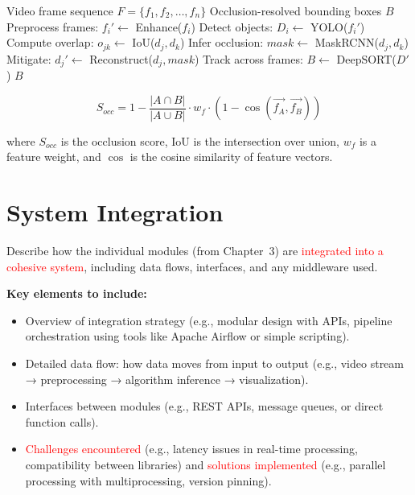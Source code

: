 \documentclass[12pt,a4paper]{report}
\theoremstyle{definition}
\theoremstyle{remark}
\begin{document}
\begin{algorithm}[htbp]
\caption{Occlusion Detection Algorithm}
\label{alg:occlusion-detection}
\begin{algorithmic}[1]
\Require Video frame sequence $F = \{f_1, f_2, \dots, f_n\}$
\Ensure Occlusion-resolved bounding boxes $B$
\State Preprocess frames: $f_i' \gets$ Enhance($f_i$) 
\State Detect objects: $D_i \gets$ YOLO($f_i'$) 
    \State Compute overlap: $o_{jk} \gets$ IoU($d_j, d_k$)
     
        \State Infer occlusion: $mask \gets$ MaskRCNN($d_j, d_k$)
        \State Mitigate: $d_j' \gets$ Reconstruct($d_j, mask$)
    \EndIf
\EndFor
\State Track across frames: $B \gets$ DeepSORT($D'$)
\Return $B$
\end{algorithmic}
\end{algorithm}

\begin{equation}
    S_{occ} = 1 - \frac{|A \cap B|}{|A \cup B|} \cdot w_f \cdot (1 - \cos(\vec{f_A}, \vec{f_B}))
    \label{eq:occlusion-score}
\end{equation}

where $S_{occ}$ is the occlusion score, IoU is the intersection over union, $w_f$ is a feature weight, and $\cos$ is the cosine similarity of feature vectors.

\section{System Integration}
\label{sec:system-integration}

Describe how the individual modules (from Chapter~3) are \textcolor{red}{integrated into a cohesive system}, including data flows, interfaces, and any middleware used.

\noindent \textbf{Key elements to include:}
\begin{itemize}
    \item Overview of integration strategy (e.g., modular design with APIs, pipeline orchestration using tools like Apache Airflow or simple scripting).
    \item Detailed data flow: how data moves from input to output (e.g., video stream → preprocessing → algorithm inference → visualization).
    \item Interfaces between modules (e.g., REST APIs, message queues, or direct function calls).
    \item \textcolor{red}{Challenges encountered} (e.g., latency issues in real-time processing, compatibility between libraries) and \textcolor{red}{solutions implemented} (e.g., parallel processing with multiprocessing, version pinning).
\end{itemize}
\end{document}
